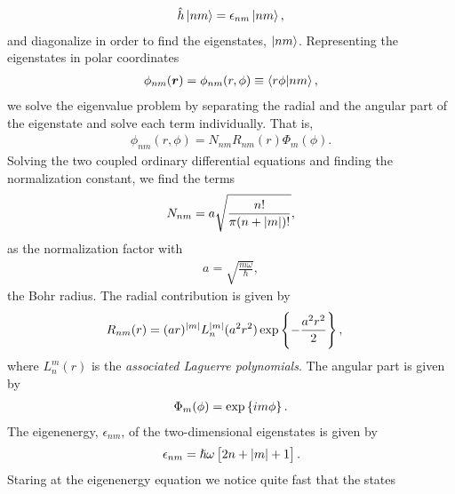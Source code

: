         \begin{align}
            \hat{h}\ket{nm} = \epsilon_{nm}\ket{nm},
        \end{align}
        and diagonalize in order to find the eigenstates, $\ket{nm}$.
        Representing the eigenstates in polar coordinates
        \begin{align}
            \phi_{nm}(\boldsymbol{r}) = \phi_{nm}(r, \phi)
            \equiv \braket{r\phi}{nm},
        \end{align}
        we solve the eigenvalue problem by separating the radial and the angular
        part of the eigenstate and solve each term individually. That is,
        \begin{align}
            \phi_{nm}(r, \phi) = N_{nm}R_{nm}(r)\Phi_{m}(\phi).
            \label{eq:spf-2dqd}
        \end{align}
        Solving the two coupled ordinary differential equations and finding the
        normalization constant, we find the terms
        \begin{align}
            N_{nm} = a\sqrt{\frac{n!}{\pi(n + \abs{m})!}},
        \end{align}
        as the normalization factor with
        \begin{align}
            a = \sqrt{\frac{m\omega}{\hslash}},
        \end{align}
        the Bohr radius. The radial contribution is given by
        \begin{align}
            R_{nm}(r)
            &= (ar)^{\abs{m}}L^{\abs{m}}_{n}(a^2r^2)
            \exp\left\{ -\frac{a^2 r^2}{2} \right\},
            \label{eq:radial-function-tdho}
        \end{align}
        where $L^{m}_{n}(r)$ is the \emph{associated Laguerre polynomials}. The
        angular part is given by
        \begin{align}
            \Phi_m(\phi) = \exp\left\{ im\phi \right\}.
        \end{align}
        The eigenenergy, $\epsilon_{nm}$, of the two-dimensional eigenstates is
        given by
        \begin{align}
            \epsilon_{nm} = \hslash\omega\left[ 
                2n + \abs{m} + 1
             \right].
            \label{eq:eigenenergies_2dqd}
        \end{align}
        Staring at the eigenenergy equation we notice quite fast that the states
